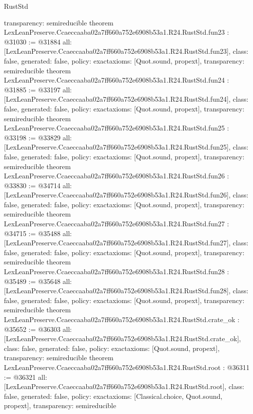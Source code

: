 \begin{lexlean}{RustStd}
\begin{coremodule}
{  transparency: semireducible
}
theorem LexLeanPreserve.Ccaeccaaba02a7ff660a752e6908b53a1.R24.RustStd.fun23 : @31030 := @31884 {
  all: [LexLeanPreserve.Ccaeccaaba02a7ff660a752e6908b53a1.R24.RustStd.fun23],
  class: false,
  generated: false,
  policy: exact{axioms: [Quot.sound, propext]},
  transparency: semireducible
}
theorem LexLeanPreserve.Ccaeccaaba02a7ff660a752e6908b53a1.R24.RustStd.fun24 : @31885 := @33197 {
  all: [LexLeanPreserve.Ccaeccaaba02a7ff660a752e6908b53a1.R24.RustStd.fun24],
  class: false,
  generated: false,
  policy: exact{axioms: [Quot.sound, propext]},
  transparency: semireducible
}
theorem LexLeanPreserve.Ccaeccaaba02a7ff660a752e6908b53a1.R24.RustStd.fun25 : @33198 := @33829 {
  all: [LexLeanPreserve.Ccaeccaaba02a7ff660a752e6908b53a1.R24.RustStd.fun25],
  class: false,
  generated: false,
  policy: exact{axioms: [Quot.sound, propext]},
  transparency: semireducible
}
theorem LexLeanPreserve.Ccaeccaaba02a7ff660a752e6908b53a1.R24.RustStd.fun26 : @33830 := @34714 {
  all: [LexLeanPreserve.Ccaeccaaba02a7ff660a752e6908b53a1.R24.RustStd.fun26],
  class: false,
  generated: false,
  policy: exact{axioms: [Quot.sound, propext]},
  transparency: semireducible
}
theorem LexLeanPreserve.Ccaeccaaba02a7ff660a752e6908b53a1.R24.RustStd.fun27 : @34715 := @35488 {
  all: [LexLeanPreserve.Ccaeccaaba02a7ff660a752e6908b53a1.R24.RustStd.fun27],
  class: false,
  generated: false,
  policy: exact{axioms: [Quot.sound, propext]},
  transparency: semireducible
}
theorem LexLeanPreserve.Ccaeccaaba02a7ff660a752e6908b53a1.R24.RustStd.fun28 : @35489 := @35648 {
  all: [LexLeanPreserve.Ccaeccaaba02a7ff660a752e6908b53a1.R24.RustStd.fun28],
  class: false,
  generated: false,
  policy: exact{axioms: [Quot.sound, propext]},
  transparency: semireducible
}
theorem LexLeanPreserve.Ccaeccaaba02a7ff660a752e6908b53a1.R24.RustStd.crate_ok : @35652 := @36303 {
  all: [LexLeanPreserve.Ccaeccaaba02a7ff660a752e6908b53a1.R24.RustStd.crate_ok],
  class: false,
  generated: false,
  policy: exact{axioms: [Quot.sound, propext]},
  transparency: semireducible
}
theorem LexLeanPreserve.Ccaeccaaba02a7ff660a752e6908b53a1.R24.RustStd.root : @36311 := @36321 {
  all: [LexLeanPreserve.Ccaeccaaba02a7ff660a752e6908b53a1.R24.RustStd.root],
  class: false,
  generated: false,
  policy: exact{axioms: [Classical.choice, Quot.sound, propext]},
  transparency: semireducible
}


\end{coremodule}
\end{lexlean}
